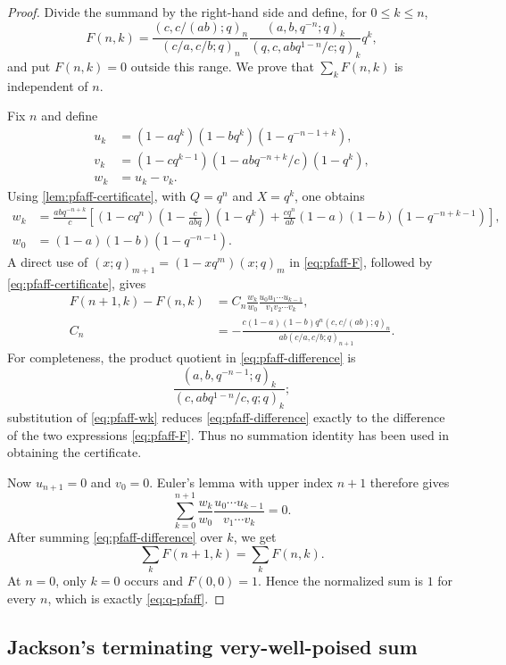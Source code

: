 \documentclass[11pt,oneside]{article}
\theoremstyle{definition}
\begin{document}
\begin{proof}
Divide the summand by the right-hand side and define, for $0\le k\le n$,
\begin{equation}\label{eq:pfaff-F}
 F(n,k)=
 \frac{(c,c/(ab);q)_n}{(c/a,c/b;q)_n}
 \frac{(a,b,q^{-n};q)_k}{(q,c,abq^{1-n}/c;q)_k}q^k,
\end{equation}
and put $F(n,k)=0$ outside this range. We prove that
$\sum_kF(n,k)$ is independent of $n$.

Fix $n$ and define
\begin{align*}
 u_k&=(1-aq^k)(1-bq^k)(1-q^{-n-1+k}),\\
 v_k&=(1-cq^{k-1})(1-abq^{-n+k}/c)(1-q^k),\\
 w_k&=u_k-v_k.
\end{align*}
Using \cref{lem:pfaff-certificate}, with $Q=q^n$ and $X=q^k$, one obtains
\begin{align}
 w_k&=\frac{abq^{-n+k}}{c}
 \left[
 (1-cq^n)\left(1-\frac{c}{abq}\right)(1-q^k)
 +\frac{cq^n}{ab}(1-a)(1-b)(1-q^{-n+k-1})
 \right],\label{eq:pfaff-wk}\\
 w_0&=(1-a)(1-b)(1-q^{-n-1}).\label{eq:pfaff-w0}
\end{align}
A direct use of $(x;q)_{m+1}=(1-xq^m)(x;q)_m$ in \eqref{eq:pfaff-F}, followed by \eqref{eq:pfaff-certificate}, gives
\begin{align}
 F(n+1,k)-F(n,k)
 &=C_n\frac{w_k}{w_0}
   \frac{u_0u_1\cdots u_{k-1}}{v_1v_2\cdots v_k},
 \label{eq:pfaff-difference}\\
 C_n&=-\frac{c(1-a)(1-b)q^n(c,c/(ab);q)_n}
 {ab(c/a,c/b;q)_{n+1}}.
\end{align}
For completeness, the product quotient in \eqref{eq:pfaff-difference} is
\[
 \frac{(a,b,q^{-n-1};q)_k}
 {(c,abq^{1-n}/c,q;q)_k};
\]
substitution of \eqref{eq:pfaff-wk} reduces \eqref{eq:pfaff-difference} exactly to the difference of the two expressions \eqref{eq:pfaff-F}. Thus no summation identity has been used in obtaining the certificate.

Now $u_{n+1}=0$ and $v_0=0$. Euler's lemma with upper index $n+1$ therefore gives
\[
 \sum_{k=0}^{n+1}\frac{w_k}{w_0}
 \frac{u_0\cdots u_{k-1}}{v_1\cdots v_k}=0.
\]
After summing \eqref{eq:pfaff-difference} over $k$, we get
\[
 \sum_kF(n+1,k)=\sum_kF(n,k).
\]
At $n=0$, only $k=0$ occurs and $F(0,0)=1$. Hence the normalized sum is $1$ for every $n$, which is exactly \eqref{eq:q-pfaff}.
\end{proof}

\subsection{Jackson's terminating very-well-poised sum}
\end{document}
